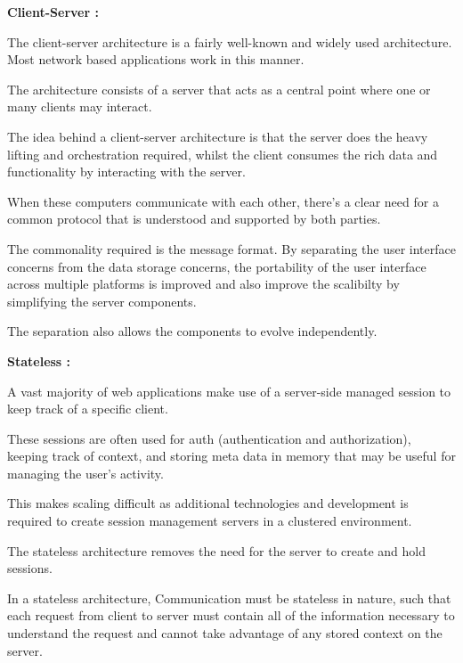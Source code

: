 \begin{DoxyItemize}
\item {\bfseries Client-\/\+Server \+:}
\begin{DoxyItemize}
\item The client-\/server architecture is a fairly well-\/known and widely used architecture. Most network based applications work in this manner.
\item The architecture consists of a server that acts as a central point where one or many clients may interact.
\item The idea behind a client-\/server architecture is that the server does the heavy lifting and orchestration required, whilst the client consumes the rich data and functionality by interacting with the server.
\item When these computers communicate with each other, there’s a clear need for a common protocol that is understood and supported by both parties.
\item The commonality required is the message format. By separating the user interface concerns from the data storage concerns, the portability of the user interface across multiple platforms is improved and also improve the scalibilty by simplifying the server components.
\item The separation also allows the components to evolve independently. 
\end{DoxyItemize}
\item {\bfseries Stateless \+:}
\begin{DoxyItemize}
\item A vast majority of web applications make use of a server-\/side managed session to keep track of a specific client.
\item These sessions are often used for auth (authentication and authorization), keeping track of context, and storing meta data in memory that may be useful for managing the user’s activity.
\item This makes scaling difficult as additional technologies and development is required to create session management servers in a clustered environment.
\item The stateless architecture removes the need for the server to create and hold sessions.
\item In a stateless architecture, Communication must be stateless in nature, such that each request from client to server must contain all of the information necessary to understand the request and cannot take advantage of any stored context on the server.

\end{DoxyItemize}
\end{DoxyItemize}
